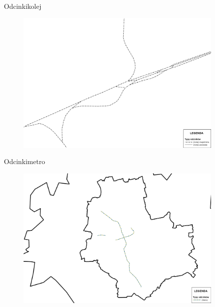 \documentclass[8pt]{beamer}
\begin{document}
\begin{frame}{Odcinki}{kolej}
\begin{figure}
\begin{center}
\includegraphics[width=0.9\textwidth]{rail}
 \end{center}
  \end{figure} 
\end{frame}

\begin{frame}{Odcinki}{metro}
\begin{figure}
\begin{center}
\includegraphics[width=0.9\textwidth]{metro}
 \end{center}
  \end{figure} 
\end{frame}
\end{document}
